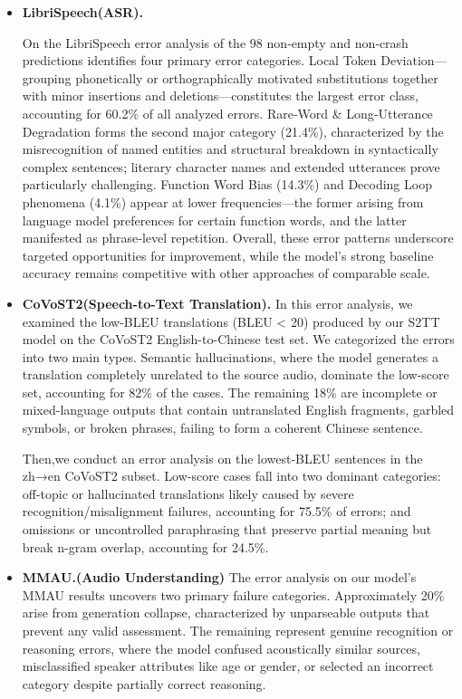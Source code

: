 \documentclass{llmxive}
\begin{document}
\label{app:analysis:err:breakdown}
\begin{itemize}[leftmargin=0.5em,label=\textbullet,itemsep=0.35em,topsep=0.35em]
    \item \textbf{LibriSpeech(ASR).}
  
  On the LibriSpeech  error analysis of the 98 non‑empty and non‑crash predictions identifies four primary error categories. Local Token Deviation—grouping phonetically or orthographically motivated substitutions together with minor insertions and deletions—constitutes the largest error class, accounting for 60.2\% of all analyzed errors. Rare‑Word \& Long‑Utterance Degradation forms the second major category (21.4\%), characterized by the misrecognition of named entities and structural breakdown in syntactically complex sentences; literary character names and extended utterances prove particularly challenging. Function Word Bias (14.3\%) and Decoding Loop phenomena (4.1\%) appear at lower frequencies—the former arising from language model preferences for certain function words, and the latter manifested as phrase‑level repetition. Overall, these error patterns underscore targeted opportunities for improvement, while the model's strong baseline accuracy remains competitive with other approaches of comparable scale. 
  
    \item \textbf{CoVoST2(Speech-to-Text Translation).}
    In this error analysis, we examined the low-BLEU translations (BLEU < 20) produced by our S2TT model on the CoVoST2 English-to-Chinese test set. We categorized the errors into two main types. Semantic hallucinations, where the model generates a translation completely unrelated to the source audio, dominate the low-score set, accounting for 82\% of the cases. The remaining 18\% are incomplete or mixed-language outputs that contain untranslated English fragments, garbled symbols, or broken phrases, failing to form a coherent Chinese sentence. 

    Then,we conduct an error analysis on the lowest-BLEU  sentences in the zh→en CoVoST2 subset. Low-score cases fall into two dominant categories:  off-topic or hallucinated translations likely caused by severe recognition/misalignment failures, accounting for 75.5\% of errors;  and omissions or uncontrolled paraphrasing that preserve partial meaning but break n-gram overlap, accounting for 24.5\%. 

    \item \textbf{MMAU.(Audio Understanding)}
    The error analysis on our model's MMAU results uncovers two primary failure categories. Approximately 20\% arise from generation collapse, characterized by unparseable outputs that prevent any valid assessment. The remaining  represent genuine recognition or reasoning errors, where the model confused acoustically similar sources, misclassified speaker attributes like age or gender, or selected an incorrect category despite partially correct reasoning.


\end{itemize}
\end{document}
